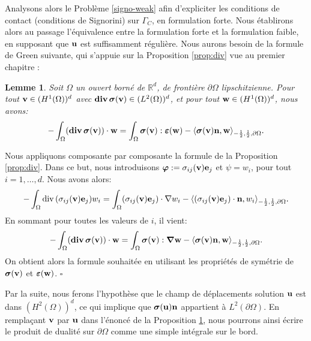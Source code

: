 \documentclass[11pt]{book}
\newtheorem{lemma}[theorem]{Lemme}
\newcommand{\bl}{\begin{lemma}}
\newcommand{\el}{\end{lemma}}
\newcommand{\cqfd}{{$\mbox{}$\hfill$\square$}}
\def\u{{\bf u}}
\def\boe{{\bf e}}
\def\n{{\bf n}}
\def\vv{{\bf v}}
\def\w{{\bf w}}
\def\x{{\bf x}}
\newcommand{\R}{\mathbb{R}}
\newcommand{\bnabla}{\mbox{\boldmath{$\nabla$}}}
\newcommand{\bphi}{\mbox{\boldmath{$\varphi$}}}
\newcommand{\bs}{\mbox{\boldmath{$\sigma$}}}
\newcommand{\e}{\mbox{\boldmath{$\varepsilon$}}}
\renewcommand{\div} {{\rm{div} \,}}
\begin{document}
Analysons alors le Problème \eqref{signo-weak} afin d'expliciter les conditions de contact (conditions de Signorini) sur $\Gamma_C$, en formulation forte. Nous établirons alors au passage l'équivalence entre la formulation forte et la formulation faible, en supposant que $\u$ est suffisamment régulière.
Nous aurons besoin de la formule de Green suivante, qui s'appuie sur la Proposition \ref{prop:div} vue au premier chapitre :
\bl\label{green-elasticity}
Soit $\Omega$ un ouvert borné de $\R^d$, de frontière $\partial \Omega$ lipschitzienne. Pour tout $\vv \in (H^1(\Omega))^d$ avec ${\bf div}\, \bs(\vv) \in (L^2(\Omega))^d$, et pour tout $\w \in (H^1(\Omega))^d$, nous avons:
\begin{equation}\label{eq:green-elasticity}
 - \int_\Omega ({\bf div}\, \bs(\vv) ) \cdot \w = %
 \int_{\Omega}  \bs(\vv) : \e(\w) %
- \langle \bs(\vv) \n , \w \rangle_{-\frac12,\frac12,\partial \Omega}.
\end{equation}
\el
\proof 
Nous appliquons composante par composante la formule de la Proposition \ref{prop:div}.
Dans ce but, nous introduisons $\bphi:= \sigma_{ij} (\vv) \boe_j$ et $\psi = w_i$, pour tout $i = 1,\ldots,d$. Nous avons alors:
\[
- \int_\Omega \div ( \sigma_{ij} (\vv) \boe_j ) w_i 
= 
\int_\Omega ( \sigma_{ij} (\vv) \boe_j ) \cdot \nabla w_i %
- \langle ( \sigma_{ij} (\vv) \boe_j ) \cdot \n , w_i \rangle_{-\frac12,\frac12,\partial \Omega}.
\]
En sommant pour toutes les valeurs de $i$, il vient:
\[
- \int_\Omega ({\bf div}\, \bs(\vv) ) \cdot \w = %
 \int_{\Omega}  \bs(\vv) : \bnabla \w %
- \langle \bs(\vv) \n , \w \rangle_{-\frac12,\frac12,\partial \Omega}.
\]
On obtient alors la formule souhaitée en utilisant les propriétés de symétrie de $\bs(\vv)$ et $\e(\w)$.
\cqfd

Par la suite, nous ferons l'hypothèse que le champ de déplacements solution $\u$ est dans $(H^2(\Omega))^d$, ce qui implique que $\bs(\u) \n$ appartient à $L^2(\partial \Omega)$. %
En remplaçant $\vv$ par $\u$ dans l'énoncé de la Proposition \ref{green-elasticity}, nous pourrons ainsi écrire le produit de dualité sur $\partial \Omega$ comme une simple intégrale sur le bord.

\medskip
\end{document}
